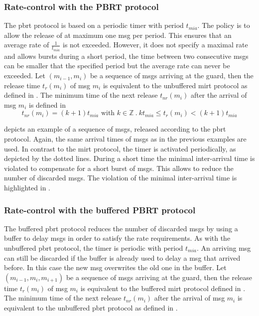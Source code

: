\subsubsection{Rate-control with the PBRT protocol}
The \gls{pbrt} protocol is based on a periodic timer with period $t_{mia}$.
The policy is to allow the release of at maximum one \gls*{msg} per period.
This ensures that an average rate of $\frac{1}{t_{mia}}$ is not exceeded.
However, it does not specify a maximal rate and allows bursts during a short period, \ie the time between two consecutive \glspl*{msg} can be smaller that the specified period but the average rate can never be exceeded.
Let $( m_{i-1}, m_i )$ be a sequence of \glspl*{msg} arriving at the guard, then the release time $t_r(m_i)$ of \gls*{msg} $m_i$ is equivalent to the unbuffered \gls{mirt} protocol as defined in \Equ{\ref{eq_mirt_release}}.
The minimum time of the next release $t_{nr}(m_i)$ after the arrival of \gls*{msg} $m_i$ is defined in \Equ{\ref{eq_pbrt_next_release}}
\begin{equation}
    t_{nr}(m_i) = (k+1) t_{mia} \text{ with } k \in \mathbb{Z} \ . \ kt_{mia} \leq t_r(m_i) < (k+1)t_{mia}
    \label{eq_pbrt_next_release}
\end{equation}

\Fig{\ref{fig_rate_ctl_pbrt}} depicts an example of a sequence of \glspl*{msg}, released according to the \gls{pbrt} protocol.
Again, the same arrival times of \glspl*{msg} as in the previous examples are used.
In contrast to the \gls{mirt} protocol, the timer is activated periodically, as depicted by the dotted lines.
During a short time the minimal inter-arrival time is violated to compensate for a short burst of \glspl*{msg}.
This allows to reduce the number of discarded \glspl*{msg}.
The violation of the minimal inter-arrival time is highlighted in \Fig{\ref{fig_rate_ctl_pbrt}}.

\subsubsection{Rate-control with the buffered PBRT protocol}
The buffered \gls{pbrt} protocol reduces the number of discarded \glspl*{msg} by using a buffer to delay \glspl*{msg} in order to satisfy the rate requirements.
As with the unbuffered \gls{pbrt} protocol, the timer is periodic with period $t_{mia}$.
An arriving \gls*{msg} can still be discarded if the buffer is already used to delay a \gls*{msg} that arrived before.
In this case the new \gls*{msg} overwrites the old one in the buffer.
Let $( m_{i-1}, m_i, m_{i+1} )$ be a sequence of \glspl*{msg} arriving at the guard, then the release time $t_r(m_i)$ of \gls*{msg} $m_i$ is equivalent to the buffered \gls{mirt} protocol defined in \Equ{\ref{eq_bmirt_release}}.
The minimum time of the next release $t_{nr}(m_i)$ after the arrival of \gls*{msg} $m_i$ is equivalent to the unbuffered \gls{pbrt} protocol as defined in \Equ{\ref{eq_pbrt_next_release}}.

